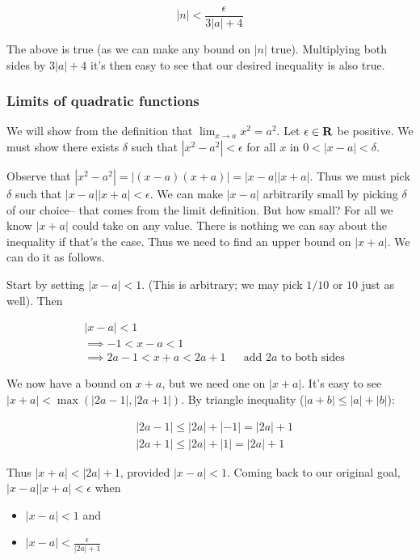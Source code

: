 \[|n|<\frac{\epsilon}{3|a|+4}\]

The above is true (as we can make any bound on $|n|$ true).
Multiplying both sides by $3|a|+4$ it's then easy to see that our
desired inequality is also true.

\subsubsection*{Limits of quadratic functions}

We will show from the definition that $\lim_{x\to a}x^2=a^2$. Let
$\epsilon\in\mathbf{R}$ be positive. We must show there exists $\delta$ such that
$|x^2-a^2|<\epsilon$ for all $x$ in $0<|x-a|<\delta$.

\vs

Observe that $|x^2-a^2|=|(x-a)(x+a)|=|x-a||x+a|$. Thus we must pick
$\delta$ such that $|x-a||x+a|<\epsilon$. We can make $|x-a|$ arbitrarily small by
picking $\delta$ of our choice-- that comes from the limit definition. But
how small? For all we know $|x+a|$ could take on any value. There is
nothing we can say about the inequality if that's the case. Thus we
need to find an upper bound on $|x+a|$. We can do it as follows.

\vs

Start by setting $|x-a|<1$. (This is arbitrary; we may pick $1/10$ or
$10$ just as well). Then

\begin{align*}
    &|x-a|<1\\
    &\implies -1<x-a<1\\
    &\implies 2a-1<x+a<2a+1&&\text{add $2a$ to both sides}
\end{align*}

We now have a bound on $x+a$, but we need one on $|x+a|$. It's easy to
see $|x+a|<\max(|2a-1|, |2a+1|)$. By triangle inequality
($|a+b|\leq|a|+|b|$):

\begin{align*}
    &|2a-1|\leq|2a|+|-1|=|2a|+1\\
    &|2a+1|\leq|2a|+|1|=|2a|+1
\end{align*}

Thus $|x+a|<|2a|+1$, provided $|x-a|<1$. Coming back to our original
goal, $|x-a||x+a|<\epsilon$ when

\begin{itemize}
    \item $|x-a|<1$ and
    \item $|x-a|<\frac{\epsilon}{|2a|+1}$
\end{itemize}

